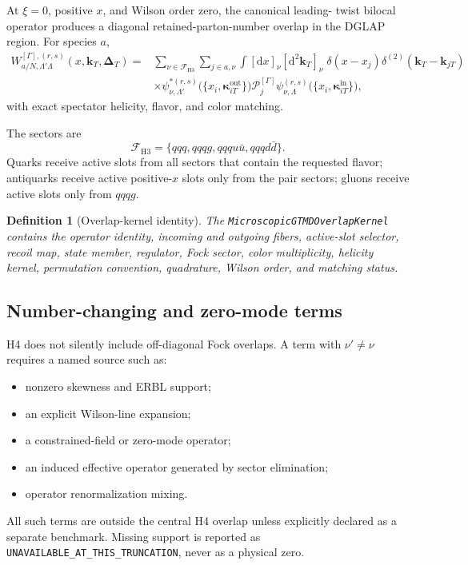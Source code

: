 \documentclass[11pt]{article}
\newtheorem{definition}{Definition}[section]
\newcommand{\kT}{\bm{k}_{T}}
\newcommand{\DT}{\bm{\Delta}_{T}}
\newcommand{\dd}{\mathrm{d}}
\newcommand{\cP}{\mathcal P}
\newcommand{\cF}{\mathcal F}
\newcommand{\OverlapKernel}{\texttt{MicroscopicGTMDOverlapKernel}}
\begin{document}
At \(\xi=0\), positive \(x\), and Wilson order zero, the canonical leading-
twist bilocal operator produces a diagonal retained-parton-number overlap in
the DGLAP region.  For species \(a\),
\begin{align}
 W_{a/N,\Lambda'\Lambda}^{[\Gamma],(r,s)}
 (x,\kT,\DT)
 ={}&
 \sum_{\nu\in\cF_{\mathrm{H3}}}
 \sum_{j\in a,\nu}
 \int[\dd x]_{\nu}[\dd^2\bm k_T]_{\nu}
 \;\delta(x-x_j)
 \delta^{(2)}(\kT-\bm k_{jT})
 \nonumber\\
 &\times
 \psi_{\nu,\Lambda'}^{*(r,s)}
 \bigl(\{x_i,\bm\kappa_{iT}^{\mathrm{out}}\}\bigr)
 \cP_{j}^{[\Gamma]}
 \psi_{\nu,\Lambda}^{(r,s)}
 \bigl(\{x_i,\bm\kappa_{iT}^{\mathrm{in}}\}\bigr),
 \label{eq:common-overlap}
\end{align}
with exact spectator helicity, flavor, and color matching.

The sectors are
\begin{equation}
 \cF_{\mathrm{H3}}
 =
 \{qqq,qqqg,qqqu\bar u,qqqd\bar d\}.
\end{equation}
Quarks receive active slots from all sectors that contain the requested
flavor; antiquarks receive active positive-\(x\) slots only from the pair
sectors; gluons receive active slots only from \(qqqg\).

\begin{definition}[Overlap-kernel identity]
The \OverlapKernel{} contains the operator identity, incoming and outgoing
fibers, active-slot selector, recoil map, state member, regulator, Fock
sector, color multiplicity, helicity kernel, permutation convention,
quadrature, Wilson order, and matching status.
\end{definition}

\subsection{Number-changing and zero-mode terms}

H4 does not silently include off-diagonal Fock overlaps.  A term with
\(\nu'\neq\nu\) requires a named source such as:
\begin{itemize}
\item nonzero skewness and ERBL support;
\item an explicit Wilson-line expansion;
\item a constrained-field or zero-mode operator;
\item an induced effective operator generated by sector elimination;
\item operator renormalization mixing.
\end{itemize}
All such terms are outside the central H4 overlap unless explicitly declared
as a separate benchmark.  Missing support is reported as
\texttt{UNAVAILABLE\_AT\_THIS\_TRUNCATION}, never as a physical zero.
\end{document}

